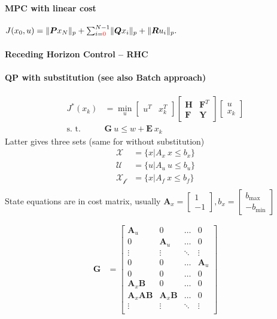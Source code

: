 \documentclass[landscape,a4paper,8pt]{scrartcl}
\newcommand{\remph}[1]{{\textcolor{red}{#1}}}
\newcommand{\mc}[1]{\mathcal{#1}}
\newcommand\vA{\bm{A}}
\newcommand\vB{\bm{B}}
\newcommand\vE{\bm{E}}
\newcommand\vF{\bm{F}}
\newcommand\vG{\bm{G}}
\newcommand\vH{\bm{H}}
\newcommand\vP{\bm{P}}
\newcommand\vQ{\bm{Q}}
\newcommand\vR{\bm{R}}
\newcommand\vY{\bm{Y}}
\newcommand{\Me}[1]{\begin{bmatrix}#1\end{bmatrix}} %
\begin{document}
\begin{multicols*}{3}
\paragraph{MPC with linear cost}
$J(x_0, u) = \lVert \vP x_N \rVert_p + \sum_{i=\remph{0}}^{N-1} \lVert \vQ x_i \rVert_p + \lVert \vR u_i \rVert_p.$



\paragraph{Receding Horizon Control -- RHC}

\paragraph{QP with substitution (see also Batch approach)}
\begin{align*}
J^*(x_k) & = \min_u \Me{u^T & x_k^T}\Me{\vH & \vF^T \\ \vF & \vY}\Me{u \\ x_k} \\
\text{s. t. } & \vG\ u \leq w + \vE\ x_k
\end{align*}
Latter gives three sets (same for without substitution)
\begin{align*}
\mc{X}   & = \{ x | A_x\ x \leq b_x\} \\
\mc{U}   & = \{ u | A_u\ u \leq b_u\} \\
\mc{X_f} & = \{ x | A_f\ x \leq b_f\} \\
\end{align*}
State equations are in cost matrix, usually $\vA_x = \Me{1 \\ -1}, b_x = \Me{b_\text{max} \\ -b_\text{min}}$
\begin{scriptsize}
\setlength{\arraycolsep}{2pt}
\begin{align*}
\vG & = \Me{\vA_u & 0 & \dots & 0 \\
          0 & \vA_u & \dots & 0 \\
          \vdots & \vdots & \ddots & \vdots \\
					0      & 0 & \dots & \vA_u \\
					0      & 0 & \dots & 0 \\
					\vA_x\vB & 0 & \dots & 0 \\
					\vA_x\vA\vB & \vA_x\vB & \dots & 0 \\
					\vdots & \vdots & \ddots & \vdots \\
}
\end{align*}
\end{scriptsize}
\end{multicols*}
\end{document}
